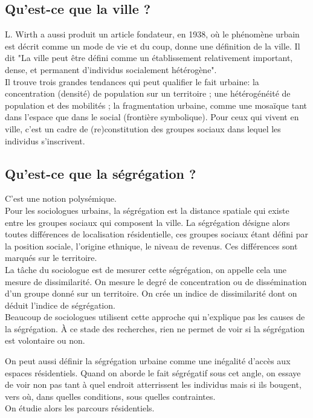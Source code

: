 \documentclass[12pt, a4paper, openany]{book}
\begin{document}
\subsection{Qu'est-ce que la ville ?}

L. Wirth a aussi produit un article fondateur, en 1938, où le phénomène urbain est décrit comme un mode de vie et du coup, donne une définition de la ville. Il dit "La ville peut être défini comme un établissement relativement important, dense, et permanent d'individus socialement hétérogène". \\
Il trouve trois grandes tendances qui peut qualifier le fait urbaine: la concentration (densité) de population sur un territoire ; une hétérogénéité de population et des mobilités ; la fragmentation urbaine, comme une mosaïque tant dans l'espace que dans le social (frontière symbolique). Pour ceux qui vivent en ville, c'est un cadre de (re)constitution des groupes sociaux dans lequel les individus s'inscrivent. 

\subsection{Qu'est-ce que la ségrégation ?}

C'est une notion polysémique. \\
Pour les sociologues urbains, la ségrégation est la distance spatiale qui existe entre les groupes sociaux qui composent la ville. La ségrégation désigne alors toutes différences de localisation résidentielle, ces groupes sociaux étant défini par la position sociale, l'origine ethnique, le niveau de revenus. Ces différences sont marqués sur le territoire. \\
La tâche du sociologue est de mesurer cette ségrégation, on appelle cela une mesure de dissimilarité. On mesure le degré de concentration ou de dissémination d'un groupe donné sur un territoire. On crée un indice de dissimilarité dont on déduit l'indice de ségrégation. \\
Beaucoup de sociologues utilisent cette approche qui n'explique pas les causes de la ségrégation. À ce stade des recherches, rien ne permet de voir si la ségrégation est volontaire ou non. 


On peut aussi définir la ségrégation urbaine comme une inégalité d'accès aux espaces résidentiels. Quand on aborde le fait ségrégatif sous cet angle, on essaye de voir non pas tant à quel endroit atterrissent les individus mais si ils bougent, vers où, dans quelles conditions, sous quelles contraintes. \\
On étudie alors les parcours résidentiels.
\end{document}
